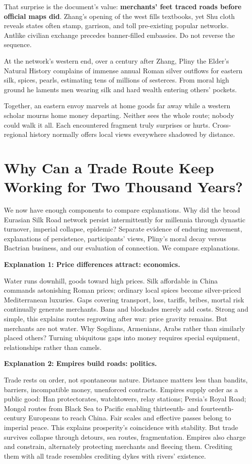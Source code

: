 That surprise is the document's value: \textbf{merchants' feet traced roads before official maps did}. Zhang's opening of the west fills textbooks, yet Shu cloth reveals states often stamp, garrison, and toll pre-existing popular networks. Antlike civilian exchange precedes banner-filled embassies. Do not reverse the sequence.

At the network's western end, over a century after Zhang, Pliny the Elder's Natural History complains of immense annual Roman silver outflows for eastern silk, spices, pearls, estimating tens of millions of sesterces. From moral high ground he laments men wearing silk and hard wealth entering others' pockets.

Together, an eastern envoy marvels at home goods far away while a western scholar mourns home money departing. Neither sees the whole route; nobody could walk it all. Each encountered fragment truly surprises or hurts. Cross-regional history normally offers local views everywhere shadowed by distance.

\section[Why Trade Routes Survive Millennia]{Why Can a Trade Route Keep Working for Two Thousand Years?}
We now have enough components to compare explanations. Why did the broad Eurasian Silk Road network persist intermittently for millennia through dynastic turnover, imperial collapse, epidemic? Separate evidence of enduring movement, explanations of persistence, participants' views, Pliny's moral decay versus Bactrian business, and our evaluation of connection. We compare explanations.

\textbf{Explanation 1: Price differences attract: economics.}

Water runs downhill, goods toward high prices. Silk affordable in China commands astonishing Roman prices; ordinary local spices become silver-priced Mediterranean luxuries. Gaps covering transport, loss, tariffs, bribes, mortal risk continually generate merchants. Bans and blockades merely add costs. Strong and simple, this explains routes regrowing after war: price gravity remains. But merchants are not water. Why Sogdians, Armenians, Arabs rather than similarly placed others? Turning ubiquitous gaps into money requires special equipment, relationships rather than camels.

\textbf{Explanation 2: Empires build roads: politics.}

Trade rests on order, not spontaneous nature. Distance matters less than bandits, barriers, incompatible money, unenforced contracts. Empires supply order as a public good: Han protectorates, watchtowers, relay stations; Persia's Royal Road; Mongol routes from Black Sea to Pacific enabling thirteenth- and fourteenth-century Europeans to reach China. Fair scales and effective passes belong to imperial peace. This explains prosperity's coincidence with stability. But trade survives collapse through detours, sea routes, fragmentation. Empires also charge and constrain, alternately protecting merchants and fleecing them. Crediting them with all trade resembles crediting dykes with rivers' existence.

